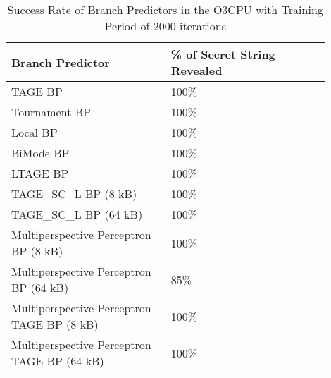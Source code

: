 \documentclass[twocolumn,showpacs,%
  nofootinbib,aps,superscriptaddress,%
  eqsecnum,prd,notitlepage,showkeys,10pt]{revtex4-1}
\begin{document}
\begin{table}
\centering
\caption{Success Rate of Branch Predictors in the O3CPU with Training Period of 2000 iterations}
\small
\begin{tabular}{|p{0.45\linewidth}|p{0.45\linewidth}|}
\hline
Branch Predictor & \% of Secret String Revealed \\
\hline
TAGE BP & 100\% \\
Tournament BP & 100\% \\
Local BP & 100\% \\
BiMode BP & 100\% \\
LTAGE BP & 100\% \\
TAGE\_SC\_L BP (8 kB) & 100\% \\
TAGE\_SC\_L BP (64 kB) & 100\% \\
Multiperspective Perceptron BP (8 kB) & 100\% \\
Multiperspective Perceptron BP (64 kB) & 85\% \\
Multiperspective Perceptron TAGE BP (8 kB) & 100\% \\
Multiperspective Perceptron TAGE BP (64 kB) & 100\% \\
\hline
\end{tabular}
\end{table}










\printbibliography
\end{document}
